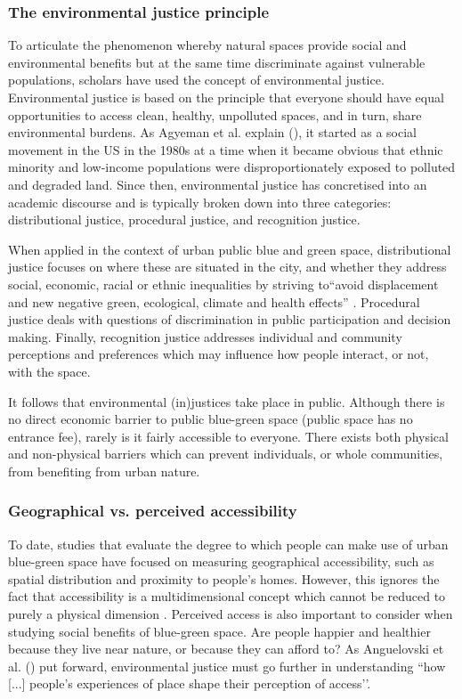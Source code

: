 \documentclass{article}
\begin{document}
\subsubsection{The environmental justice principle}

To articulate the phenomenon whereby natural spaces provide social and environmental benefits but at the same time discriminate against vulnerable populations, scholars have used the concept of environmental justice.
Environmental justice is based on the principle that everyone should have equal opportunities to access clean, healthy, unpolluted spaces, and in turn, share environmental burdens. As Agyeman et al. explain (\citeyear{agyeman2016trends}), it started as a social movement in the US in the 1980s at a time when it became obvious that ethnic minority and low-income populations were disproportionately exposed to polluted and degraded land.
Since then, environmental justice has concretised into an academic discourse and is typically broken down into three categories: distributional justice, procedural justice, and recognition justice.

When applied in the context of urban public blue and green space, distributional justice focuses on where these are situated in the city, and whether they address social, economic, racial or ethnic inequalities by striving to``avoid displacement and new negative green, ecological, climate and health effects'' \parencite{anguelovski2020expanding}.
Procedural justice deals with questions of discrimination in public participation and decision making. 
Finally, recognition justice addresses individual and community perceptions and preferences which may influence how people interact, or not, with the space.

It follows that environmental (in)justices take place in public. Although there is no direct economic barrier to public blue-green space (public space has no entrance fee), rarely is it fairly accessible to everyone. There exists both physical and non-physical barriers which can prevent individuals, or whole communities, from benefiting from urban nature.


\subsubsection{Geographical vs. perceived accessibility}

To date, studies that evaluate the degree to which people can make use of urban blue-green space have focused on measuring geographical accessibility, such as spatial distribution and proximity to people’s homes. %
However, this ignores the fact that accessibility is a multidimensional concept which cannot be reduced to purely a physical dimension \parencite{wang2015physical}. Perceived access is also important to consider when studying social benefits of blue-green space. Are people happier and healthier because they live near nature, or because they can afford to?
As Anguelovski et al. (\citeyear{anguelovski2020expanding}) put forward, environmental justice must go further in understanding ``how [...] people’s experiences of place shape their perception of access’’.
\end{document}
